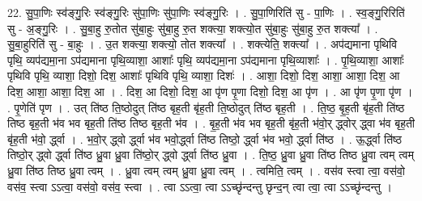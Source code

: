 \documentclass[17pt]{extarticle}
\begin{document}
22. सु॒पा॒णिः स्व॑ङ्गु॒रिः स्व॑ङ्गु॒रिः सु॑पा॒णिः सु॑पा॒णिः स्व॑ङ्गु॒रिः । . सु॒पा॒णिरिति॑ सु - पा॒णिः । . स्व॒ङ्गु॒रिरिति॑ सु - अ॒ङ्गु॒रिः । . सु॒बा॒हु रु॒तोत सु॑बा॒हुः सु॑बा॒हु रु॒त शक्त्या॒ शक्त्यो॒त सु॑बा॒हुः सु॑बा॒हु रु॒त शक्त्या᳚ । . सु॒बा॒हुरिति॑ सु - बा॒हुः । . उ॒त शक्त्या॒ शक्त्यो॒ तोत शक्त्या᳚ । . शक्त्येति॒ शक्त्या᳚ । . अप॑द्यमाना पृथिवि पृथि॒ व्यप॑द्यमा॒ना ऽप॑द्यमाना पृथि॒व्याशा॒ आशाः᳚ पृथि॒ व्यप॑द्यमा॒ना ऽप॑द्यमाना पृथि॒व्याशाः᳚ । . पृ॒थि॒व्याशा॒ आशाः᳚ पृथिवि पृथि॒ व्याशा॒ दिशो॒ दिश॒ आशाः᳚ पृथिवि पृथि॒ व्याशा॒ दिशः॑ । . आशा॒ दिशो॒ दिश॒ आशा॒ आशा॒ दिश॒ आ दिश॒ आशा॒ आशा॒ दिश॒ आ । . दिश॒ आ दिशो॒ दिश॒ आ पृ॑ण पृ॒णा दिशो॒ दिश॒ आ पृ॑ण । . आ पृ॑ण पृ॒णा पृ॑ण । . पृ॒णेति॑ पृण । . उत् ति॑ष्ठ ति॒ष्ठोदुत् ति॑ष्ठ बृह॒ती बृ॑ह॒ती ति॒ष्ठोदुत् ति॑ष्ठ बृह॒ती । . ति॒ष्ठ॒ बृ॒ह॒ती बृ॑ह॒ती ति॑ष्ठ तिष्ठ बृह॒ती भ॑व भव बृह॒ती ति॑ष्ठ तिष्ठ बृह॒ती भ॑व । . बृ॒ह॒ती भ॑व भव बृह॒ती बृ॑ह॒ती भ॑वो॒र् द्ध्वोर् द्ध्वा भ॑व बृह॒ती बृ॑ह॒ती भ॑वो॒ र्द्ध्वा । . भ॒वो॒र् द्ध्वो र्द्ध्वा भ॑व भवो॒र्द्ध्वा ति॑ष्ठ तिष्ठो॒ र्द्ध्वा भ॑व भवो॒ र्द्ध्वा ति॑ष्ठ । . ऊ॒र्द्ध्वा ति॑ष्ठ तिष्ठो॒र् द्ध्वो र्द्ध्वा ति॑ष्ठ ध्रु॒वा ध्रु॒वा ति॑ष्ठो॒र् द्ध्वो र्द्ध्वा ति॑ष्ठ ध्रु॒वा । . ति॒ष्ठ॒ ध्रु॒वा ध्रु॒वा ति॑ष्ठ तिष्ठ ध्रु॒वा त्वम् त्वम् ध्रु॒वा ति॑ष्ठ तिष्ठ ध्रु॒वा त्वम् । . ध्रु॒वा त्वम् त्वम् ध्रु॒वा ध्रु॒वा त्वम् । . त्वमिति॒ त्वम् । . वस॑व स्त्वा त्वा॒ वस॑वो॒ वस॑व॒ स्त्वा ऽऽत्वा॒ वस॑वो॒ वस॑व॒ स्त्वा । . त्वा ऽऽत्वा॒ त्वा ऽऽच्छृ॑न्दन्तु छृन्द॒न् त्वा त्वा॒ त्वा ऽऽच्छृ॑न्दन्तु । \newline
\end{document}
